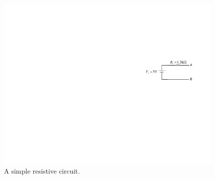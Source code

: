 \documentclass[11pt]{article}
\begin{document}

\begin{question}


    \begin{figure}[H]
        \centering
        \includegraphics[scale=1.2,angle=0]{Fig/cir3.pdf}
        \caption{A simple resistive circuit.} \label{fig:cir3}
    \end{figure}



\end{question}
\end{document}
